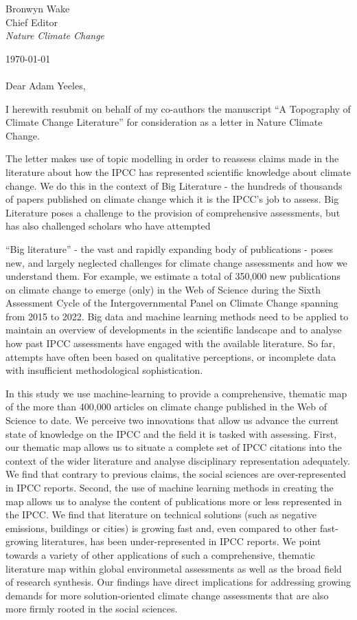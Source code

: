 \documentclass{letter}
\begin{document}
\begin{letter}{Bronwyn Wake \\ Chief Editor \\ \textit{Nature Climate Change}}
		\date{}
		
		


   \opening{\today \\ \\ Dear Adam Yeeles,}

   I herewith resubmit on behalf of my co-authors the manuscript ``A Topography of Climate Change Literature'' for consideration as a letter in Nature Climate Change.
   
   The letter makes use of topic modelling in order to reassess claims made in the literature about how the IPCC has represented scientific knowledge about climate change. We do this in the context of Big Literature - the hundreds of thousands of papers published on climate change which it is the IPCC's job to assess. Big Literature poses a challenge to the provision of comprehensive assessments, but has also challenged scholars who have attempted 

``Big literature'' - the vast and rapidly expanding body of publications - poses new, and largely neglected challenges for climate change assessments and how we understand them. For example, we estimate a total of 350,000 new publications on climate change to emerge (only) in the Web of Science during the Sixth Assessment Cycle of the Intergovernmental Panel on Climate Change spanning from 2015 to 2022. Big data and machine learning methods need to be applied to maintain an overview of developments in the scientific landscape and to analyse how past IPCC assessments have engaged with the available literature. So far, attempts \cite{Bjurström2011, Hulme2010, Victor2015, Kowarsch2017} have often been based on qualitative perceptions, or incomplete data with insufficient methodological sophistication.

In this study we use machine-learning to provide a comprehensive, thematic map of the more than 400,000 articles on climate change published in the Web of Science to date. We perceive two innovations that allow us advance the current state of knowledge on the IPCC and the field it is tasked with assessing. First, our thematic map allows us to situate a complete set of IPCC citations into the context of the wider literature and analyse disciplinary representation adequately.  We find that contrary to previous claims, the social sciences are over-represented in IPCC reports.
Second, the use of machine learning methods in creating the map allows us to analyse the content of publications more or less represented in the IPCC. We find that literature on technical solutions (such as negative emissions, buildings or cities) is growing fast and, even compared to other fast-growing literatures, has been under-represented in IPCC reports. We point towards a variety of other applications of such a comprehensive, thematic literature map within global environmetal assessments as well as the broad field of research synthesis. Our findings have direct implications for addressing growing demands for more solution-oriented climate change assessments that are also more firmly rooted in the social sciences.


\end{letter}
\end{document}
